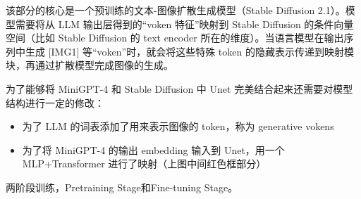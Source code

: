 \documentclass[zihao=false,fontset=windows]{ctexart}
\begin{document}

\par\vspace{0.95em}\par\vspace{0.28em}


该部分的核心是一个预训练的文本-图像扩散生成模型（Stable Diffusion 2.1）。模型需要将从 LLM 输出层得到的“voken 特征”映射到 Stable Diffusion 的条件向量空间（比如 Stable Diffusion 的 text encoder 所在的维度）。当语言模型在输出序列中生成 [IMG1] 等“voken”时，就会将这些特殊 token 的隐藏表示传递到映射模块，再通过扩散模型完成图像的生成。\par


为了能够将 MiniGPT-4 和 Stable Diffusion 中 Unet 完美结合起来还需要对模型结构进行一定的修改：\par


\begin{itemize}

\item 为了 LLM 的词表添加了用来表示图像的 token，称为 generative vokens\par


\item 为了将 MiniGPT-4 的输出 embedding 输入到 Unet，用一个 MLP+Transformer 进行了映射（上图中间红色框部分）\par

\end{itemize}


\par\vspace{1.15em}\par\vspace{0.28em}


两阶段训练，Pretraining Stage和Fine-tuning Stage。\par

\end{document}
